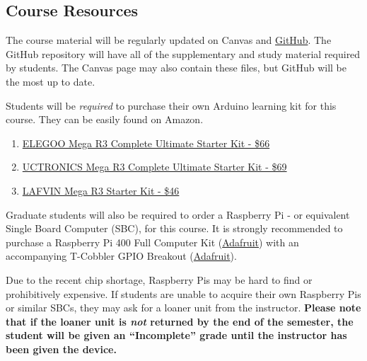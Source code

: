     \subsection*{Course Resources}
    The course material will be regularly updated on Canvas and \href{https://github.com/Legohead259/OCE4531-Material} {GitHub}. The GitHub repository will have all of the supplementary and study material required by students. The Canvas page may also contain these files, but GitHub will be the most up to date.
    
    Students will be \emph{required} to purchase their own Arduino learning kit for this course. They can be easily found on Amazon.
    
    \begin{enumerate}
        \item \href{https://www.amazon.com/EL-KIT-008-Project-Complete-Ultimate-TUTORIAL/dp/B01EWNUUUA}
        {ELEGOO Mega R3 Complete Ultimate Starter Kit - \$66}
        \item \href{https://www.amazon.com/UCTRONICS-Ultimate-Starter-Arduino-Instruction/dp/B073QGHVQC/}
        {UCTRONICS Mega R3 Complete Ultimate Starter Kit - \$69}
        \item \href{https://www.amazon.com/LAFVIN-Project-Starter-Compatible-Tutorial/dp/B07CT9KVK3/}
        {LAFVIN Mega R3 Starter Kit - \$46}
    \end{enumerate}

    Graduate students will also be required to order a Raspberry Pi - or equivalent Single Board Computer (SBC), for this course. 
    It is strongly recommended to purchase a Raspberry Pi 400 Full Computer Kit (\href{https://www.adafruit.com/product/4796}{Adafruit}) with an accompanying T-Cobbler GPIO Breakout (\href{https://www.adafruit.com/product/2028}{Adafruit}).
    
    Due to the recent chip shortage, Raspberry Pis may be hard to find or prohibitively expensive. If students are unable to acquire their own Raspberry Pis or similar SBCs, they may ask for a loaner unit from the instructor. \textbf{Please note that if the loaner unit is \emph{not} returned by the end of the semester, the student will be given an ``Incomplete'' grade until the instructor has been given the device.}


